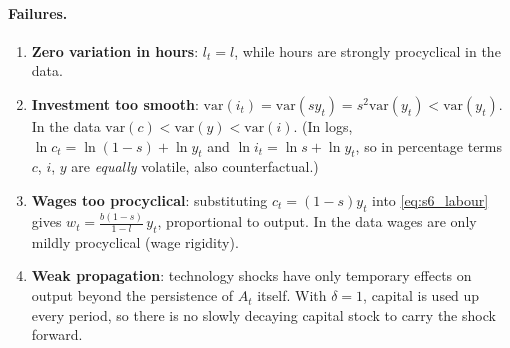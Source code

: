 \paragraph{Failures.}
\begin{enumerate}
  \item \textbf{Zero variation in hours}: $l_t=l$, while hours are strongly procyclical in the data.
  \item \textbf{Investment too smooth}: $\mathrm{var}(i_t)=\mathrm{var}(sy_t)=s^2\mathrm{var}(y_t)<\mathrm{var}(y_t)$. In the data $\mathrm{var}(c)<\mathrm{var}(y)<\mathrm{var}(i)$. (In logs, $\ln c_t=\ln(1-s)+\ln y_t$ and $\ln i_t=\ln s+\ln y_t$, so in percentage terms $c$, $i$, $y$ are \emph{equally} volatile, also counterfactual.)
  \item \textbf{Wages too procyclical}: substituting $c_t=(1-s)y_t$ into \eqref{eq:s6_labour} gives $w_t=\frac{b(1-s)}{1-l}\,y_t$, proportional to output. In the data wages are only mildly procyclical (wage rigidity).
  \item \textbf{Weak propagation}: technology shocks have only temporary effects on output beyond the persistence of $A_t$ itself. With $\delta=1$, capital is used up every period, so there is no slowly decaying capital stock to carry the shock forward.
\end{enumerate}

